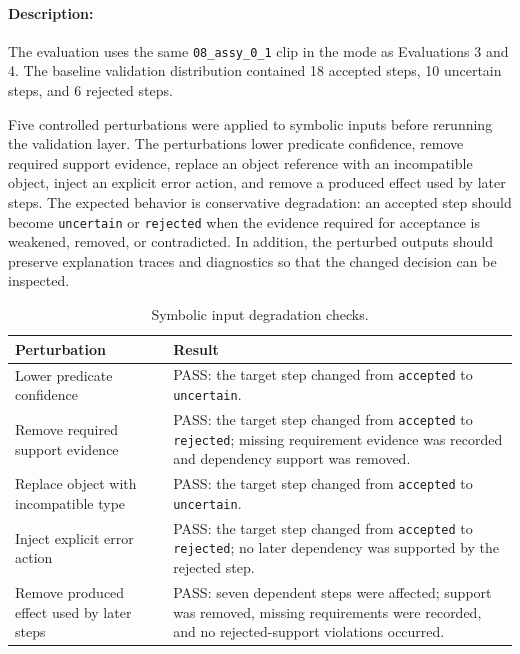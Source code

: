 \paragraph{Description:}
The evaluation uses the same \texttt{08\_assy\_0\_1} clip in the
 mode as Evaluations 3 and 4. The baseline validation distribution contained 18 accepted steps, 10 uncertain steps, and 6 rejected steps.

Five controlled perturbations were applied to symbolic inputs before rerunning
the validation layer. The perturbations lower predicate confidence, remove
required support evidence, replace an object reference with an incompatible
object, inject an explicit error action, and remove a produced effect used by
later steps. The expected behavior is conservative degradation: an accepted step
should become \texttt{uncertain} or \texttt{rejected} when the evidence required
for acceptance is weakened, removed, or contradicted. In addition, the perturbed
outputs should preserve explanation traces and diagnostics so that the changed
decision can be inspected.

\begin{table}[htbp]
\centering
\caption{Symbolic input degradation checks.}
\label{tab:evaluation-symbolic-degradation}
\small
\begin{tabular}{p{} p{}}
\toprule
Perturbation & Result \\
\midrule
Lower predicate confidence &
PASS: the target step changed from \texttt{accepted} to \texttt{uncertain}. \\

Remove required support evidence &
PASS: the target step changed from \texttt{accepted} to \texttt{rejected}; missing requirement evidence was recorded and dependency support was removed. \\

Replace object with incompatible type &
PASS: the target step changed from \texttt{accepted} to \texttt{uncertain}. \\

Inject explicit error action &
PASS: the target step changed from \texttt{accepted} to \texttt{rejected}; no later dependency was supported by the rejected step. \\

Remove produced effect used by later steps &
PASS: seven dependent steps were affected; support was removed, missing requirements were recorded, and no rejected-support violations occurred. \\
\bottomrule
\end{tabular}
\end{table}



